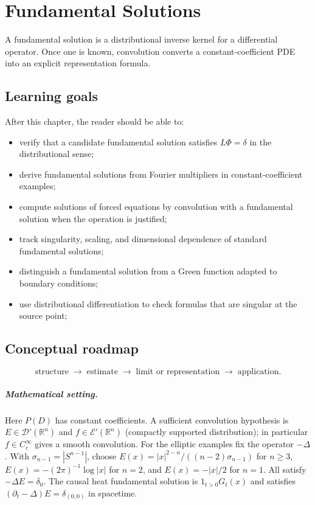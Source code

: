 \chapter{Fundamental Solutions}
\label{ch:iii24}

A fundamental solution is a distributional inverse kernel for a differential operator. Once one is known, convolution converts a constant-coefficient PDE into an explicit representation formula.

\section*{Learning goals}
After this chapter, the reader should be able to:
\begin{itemize}
\item verify that a candidate fundamental solution satisfies \(L\Phi=\delta\) in the distributional sense;
\item derive fundamental solutions from Fourier multipliers in constant-coefficient examples;
\item compute solutions of forced equations by convolution with a fundamental solution when the operation is justified;
\item track singularity, scaling, and dimensional dependence of standard fundamental solutions;
\item distinguish a fundamental solution from a Green function adapted to boundary conditions;
\item use distributional differentiation to check formulas that are singular at the source point;
\end{itemize}
\section*{Conceptual roadmap}
\[
\boxed{\text{structure}\;\longrightarrow\;\text{estimate}\;\longrightarrow\;\text{limit or representation}\;\longrightarrow\;\text{application}.}
\]

\paragraph{Mathematical setting.}
Here $P(D)$ has constant coefficients. A sufficient convolution hypothesis is $E\in\mathcal D'(\mathbb R^n)$ and $f\in\mathcal E'(\mathbb R^n)$ (compactly supported distribution); in particular $f\in C_c^\infty$ gives a smooth convolution. For the elliptic examples fix the operator $-\Delta$. With $\sigma_{n-1}=|S^{n-1}|$, choose $E(x)=|x|^{2-n}/((n-2)\sigma_{n-1})$ for $n\ge3$, $E(x)=-(2\pi)^{-1}\log|x|$ for $n=2$, and $E(x)=-|x|/2$ for $n=1$. All satisfy $-\Delta E=\delta_0$. The causal heat fundamental solution is $1_{t>0}G_t(x)$ and satisfies $(\partial_t-\Delta)E=\delta_{(0,0)}$ in spacetime.


